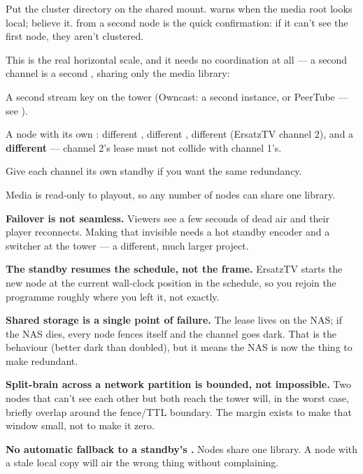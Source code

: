\documentclass[fontpath=fonts/,logopath=logo/]{riposte-doc}
\begin{document}
Put the cluster directory on the shared mount.  warns when the media root looks local; believe it.  from a second node is the quick confirmation: if it can't see the first node, they aren't clustered.



This is the real horizontal scale, and it needs no coordination at all — a second channel is a second , sharing only the media library:

\begin{ripnumbers}
\item A second stream key on the tower (Owncast: a second instance, or PeerTube — see ).
\item A node with its own : different , different , different  (ErsatzTV channel 2), and a \textbf{different } — channel 2's lease must not collide with channel 1's.
\item Give each channel its own standby if you want the same redundancy.
\end{ripnumbers}

Media is read-only to playout, so any number of nodes can share one library.



\begin{ripbullets}
\item \textbf{Failover is not seamless.} Viewers see a few seconds of dead air and their player reconnects. Making that invisible needs a hot standby encoder and a switcher at the tower — a different, much larger project.
\item \textbf{The standby resumes the schedule, not the frame.} ErsatzTV starts the new node at the current wall-clock position in the schedule, so you rejoin the programme roughly where you left it, not exactly.
\item \textbf{Shared storage is a single point of failure.} The lease lives on the NAS; if the NAS dies, every node fences itself and the channel goes dark. That is the  behaviour (better dark than doubled), but it means the NAS is now the thing to make redundant.
\item \textbf{Split-brain across a network partition is bounded, not impossible.} Two nodes that can't see each other but  both reach the tower will, in the worst case, briefly overlap around the fence/TTL boundary. The margin exists to make that window small, not to make it zero.
\item \textbf{No automatic fallback to a standby's .} Nodes share one library. A node with a stale local copy will air the wrong thing without complaining.
\end{ripbullets}

\ripdashrule


\ripend
\end{document}
